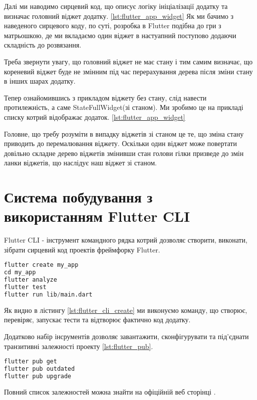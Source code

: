 Далі ми наводимо сирцевий код, що описує логіку ініціалізації додатку та визначає головний віджет додатку. \ref{lst:flutter_app_widget}
Як ми бачимо з наведеного сирцевого коду, по суті, розробка в Flutter подібна до гри з матрьошкою,
де ми вкладаємо один віджет в настуапний поступово додаючи складність до розвязання.

Треба звернути увагу, що головний віджет не має стану і тим самим визначає, що кореневий віджет буде не змінним
під час перерахування дерева після зміни стану в інших шарах додатку.

Тепер ознайомившись з прикладом віджету без стану, слід навести протилежність, а саме StateFullWidget(зі станом).
Ми зробимо це на прикладі списку котрий відображає додаток. \ref{lst:flutter_app_widget}

Головне, що требу розуміти в випадку віджетів зі станом це те, що зміна стану приводить до перемалювання віджету.
Оскільки один віджет може повертати довільно складне дерево віджетів змінивши стан голови гілки призведе до змін
ланки віджетів, що наслідує наш віджет зі станом.


\section{Система побудування з використанням Flutter CLI}
\label{sec:flutter_cli_theory}
Flutter CLI - інструмент командного рядка котрий дозволяє створити, виконати, зібрати сирцевий код проектів фреймфорку Flutter.

\begin{lstlisting}[style=light, language=Python,label={lst:flutter_cli_create},caption=Flutter Create Project]
flutter create my_app
cd my_app
flutter analyze
flutter test
flutter run lib/main.dart
\end{lstlisting}

Як видно в лістингу \ref{lst:flutter_cli_create} ми виконуємо команду, що створює, перевіряє, запускає тести та відтворює фактично код додатку.

Додатково набір інсрументів дозволяє завантажити, сконфігурувати та під'єднати транзитивні залежності проекту \ref{lst:flutter_pub}.
\begin{lstlisting}[style=light, language=Python,label={lst:flutter_pub},caption=Flutter Dependency Resolution]
flutter pub get
flutter pub outdated
flutter pub upgrade
\end{lstlisting}

Повний список залежностей можна знайти на офіційній веб сторінці \cite{flutter_cli}.


